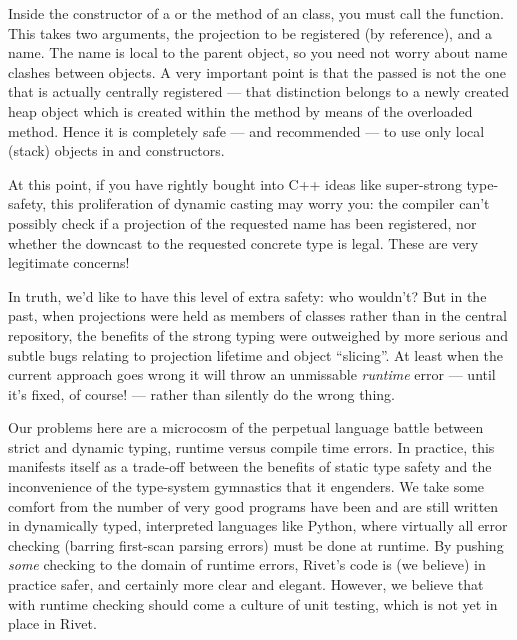 Inside the constructor of a  or the  method of an
 class, you must
call the  function. This takes two arguments, the projection
to be registered (by  reference), and a name. The name is local to
the parent object, so you need not worry about name clashes between objects. A
very important point is that the passed  is not the one that is
actually centrally registered --- that distinction belongs to a newly created
heap object which is created within the  method by means of
the overloaded  method. Hence it is completely safe
--- and recommended --- to use only local (stack) objects in 
and  constructors.


\begin{philosophy}
  At this point, if you have rightly bought into C++ ideas like super-strong
  type-safety, this proliferation of dynamic casting may worry you: the compiler
  can't possibly check if a projection of the requested name has been
  registered, nor whether the downcast to the requested concrete type is
  legal. These are very legitimate concerns!

  In truth, we'd like to have this level of extra safety: who wouldn't? But in
  the past, when projections were held as members of 
  classes rather than in the central  repository, the
  benefits of the strong typing were outweighed by more serious and subtle bugs
  relating to projection lifetime and object ``slicing''. At least when the
  current approach goes wrong it will throw an unmissable \emph{runtime} error
  --- until it's fixed, of course! --- rather than silently do the wrong thing.

  Our problems here are a microcosm of the perpetual language battle between
  strict and dynamic typing, runtime versus compile time errors. In practice,
  this manifests itself as a trade-off between the benefits of static type
  safety and the inconvenience of the type-system gymnastics that it engenders.
  We take some comfort from the number of very good programs have been and are
  still written in dynamically typed, interpreted languages like Python, where
  virtually all error checking (barring first-scan parsing errors) must be done
  at runtime. By pushing \emph{some} checking to the domain of runtime errors,
  Rivet's code is (we believe) in practice safer, and certainly more clear and
  elegant. However, we believe that with runtime checking should come a culture
  of unit testing, which is not yet in place in Rivet.


\end{philosophy}
